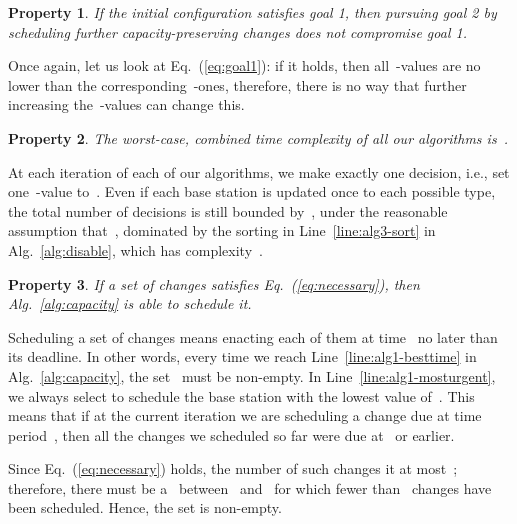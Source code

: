 \documentclass[10pt,journal,cspaper,compsoc]{IEEEtran}
\newcommand{\Eq}[1]{Eq.~(\ref{eq:#1})}
\newcommand{\Alg}[1]{Alg.~\ref{alg:#1}}
\newcommand{\Line}[1]{Line~\ref{line:#1}}
\newtheorem{property}{Property}
\begin{document}
\begin{property}
If the initial configuration satisfies goal 1, then pursuing goal 2 by scheduling further capacity-preserving
changes does not compromise goal 1.
\end{property}
\begin{IEEEproof}
Once again, let us look at \Eq{goal1}: if it holds, then all~-values are no lower than the corresponding~-ones,
therefore, there is no way that further increasing the~-values can change this.
\end{IEEEproof}

\begin{property}
\label{prop:complexity}
The worst-case, {\em combined} time complexity of all our algorithms is~.
\end{property}
\begin{IEEEproof}
At each iteration of each of our algorithms, we make exactly one decision, i.e., set one~-value to~.
Even if each base station is updated once to each possible type, the total number of decisions is still
bounded by~, under the reasonable assumption that~, dominated by the sorting in 
\Line{alg3-sort} in \Alg{disable}, which has complexity~.
\end{IEEEproof}

\begin{property}
\label{prop:feasible}
If a set of changes satisfies \Eq{necessary}, then \Alg{capacity} is able to schedule it.
\end{property}
\begin{IEEEproof}
Scheduling a set of changes means enacting each of them at time~ no later than its deadline.
In other words, every time we reach \Line{alg1-besttime} in \Alg{capacity},
the set~ must be non-empty.
In \Line{alg1-mosturgent}, we always select
to schedule the base station with the lowest value of~.
This means that if at
the current iteration we are scheduling a change due at time period~, then all
the changes we scheduled so far were due at~ or earlier.

Since \Eq{necessary}
holds, the number of such changes it at most~;
therefore, there must be a~ between~
and~ for which fewer than~ changes have been scheduled. 
Hence, the set is non-empty.
\end{IEEEproof}
\end{document}
